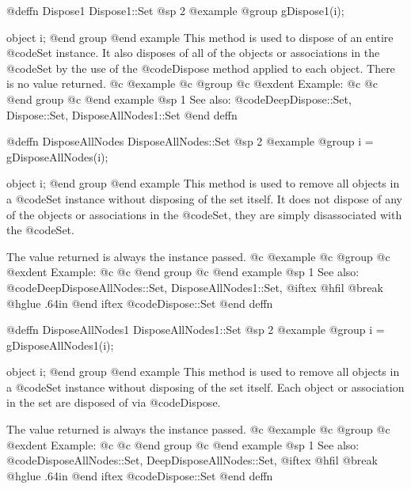 @deffn {Dispose1} Dispose1::Set
@sp 2
@example
@group
gDispose1(i);

object  i;
@end group
@end example
This method is used to dispose of an entire @code{Set} instance.  It also
disposes of all of the objects or associations in the @code{Set} by the use of
the @code{Dispose} method applied to each object.  There is no value
returned.
@c @example
@c @group
@c @exdent Example:
@c 
@c @end group
@c @end example
@sp 1
See also:  @code{DeepDispose::Set, Dispose::Set, DisposeAllNodes1::Set}
@end deffn















@deffn {DisposeAllNodes} DisposeAllNodes::Set
@sp 2
@example
@group
i = gDisposeAllNodes(i);

object  i;
@end group
@end example
This method is used to remove all objects in a @code{Set} instance
without disposing of the set itself.  It does not dispose of any of the
objects or associations in the @code{Set}, they are simply
disassociated with the @code{Set}.

The value returned is always the instance passed.
@c @example
@c @group
@c @exdent Example:
@c 
@c @end group
@c @end example
@sp 1
See also:  @code{DeepDisposeAllNodes::Set, DisposeAllNodes1::Set,}
@iftex
@hfil @break @hglue .64in      
@end iftex
@code{Dispose::Set}
@end deffn


















@deffn {DisposeAllNodes1} DisposeAllNodes1::Set
@sp 2
@example
@group
i = gDisposeAllNodes1(i);

object  i;
@end group
@end example
This method is used to remove all objects in a @code{Set} instance
without disposing of the set itself.  Each object or association in the
set are disposed of via @code{Dispose}.

The value returned is always the instance passed.
@c @example
@c @group
@c @exdent Example:
@c 
@c @end group
@c @end example
@sp 1
See also:  @code{DisposeAllNodes::Set, DeepDisposeAllNodes::Set,}
@iftex
@hfil @break @hglue .64in      
@end iftex
@code{Dispose::Set}
@end deffn














